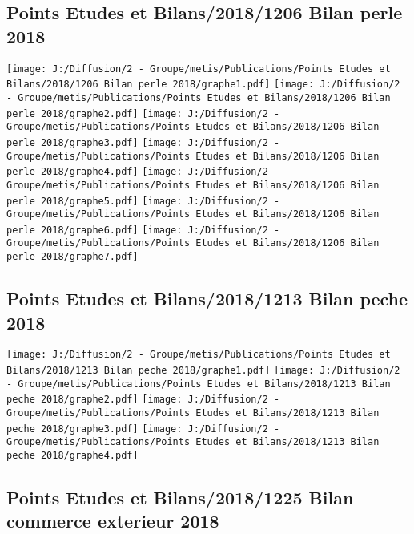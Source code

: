 \documentclass[
]{article}
\begin{document}
\hypertarget{points-etudes-et-bilans20181206-bilan-perle-2018}{%
\subsection{Points Etudes et Bilans/2018/1206 Bilan perle
2018}\label{points-etudes-et-bilans20181206-bilan-perle-2018}}

\texttt{[image: J:/Diffusion/2 - Groupe/metis/Publications/Points Etudes et Bilans/2018/1206 Bilan perle 2018/graphe1.pdf]}
\texttt{[image: J:/Diffusion/2 - Groupe/metis/Publications/Points Etudes et Bilans/2018/1206 Bilan perle 2018/graphe2.pdf]}
\texttt{[image: J:/Diffusion/2 - Groupe/metis/Publications/Points Etudes et Bilans/2018/1206 Bilan perle 2018/graphe3.pdf]}
\texttt{[image: J:/Diffusion/2 - Groupe/metis/Publications/Points Etudes et Bilans/2018/1206 Bilan perle 2018/graphe4.pdf]}
\texttt{[image: J:/Diffusion/2 - Groupe/metis/Publications/Points Etudes et Bilans/2018/1206 Bilan perle 2018/graphe5.pdf]}
\texttt{[image: J:/Diffusion/2 - Groupe/metis/Publications/Points Etudes et Bilans/2018/1206 Bilan perle 2018/graphe6.pdf]}
\texttt{[image: J:/Diffusion/2 - Groupe/metis/Publications/Points Etudes et Bilans/2018/1206 Bilan perle 2018/graphe7.pdf]}

\hypertarget{points-etudes-et-bilans20181213-bilan-peche-2018}{%
\subsection{Points Etudes et Bilans/2018/1213 Bilan peche
2018}\label{points-etudes-et-bilans20181213-bilan-peche-2018}}

\texttt{[image: J:/Diffusion/2 - Groupe/metis/Publications/Points Etudes et Bilans/2018/1213 Bilan peche 2018/graphe1.pdf]}
\texttt{[image: J:/Diffusion/2 - Groupe/metis/Publications/Points Etudes et Bilans/2018/1213 Bilan peche 2018/graphe2.pdf]}
\texttt{[image: J:/Diffusion/2 - Groupe/metis/Publications/Points Etudes et Bilans/2018/1213 Bilan peche 2018/graphe3.pdf]}
\texttt{[image: J:/Diffusion/2 - Groupe/metis/Publications/Points Etudes et Bilans/2018/1213 Bilan peche 2018/graphe4.pdf]}

\hypertarget{points-etudes-et-bilans20181225-bilan-commerce-exterieur-2018}{%
\subsection{Points Etudes et Bilans/2018/1225 Bilan commerce exterieur
2018}\label{points-etudes-et-bilans20181225-bilan-commerce-exterieur-2018}}
\end{document}
